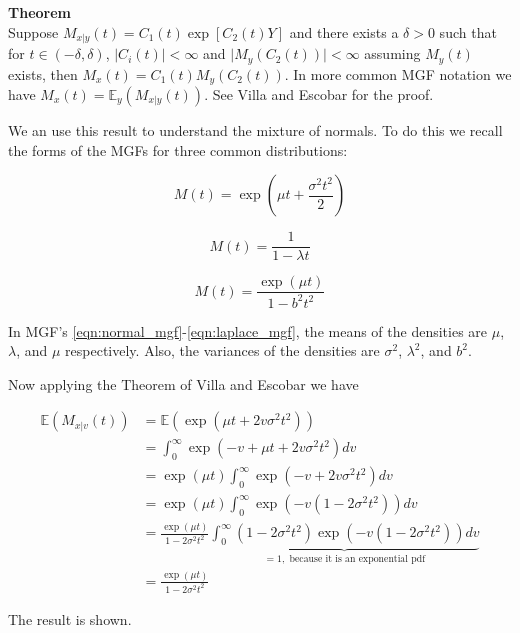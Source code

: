 \noindent \textbf{Theorem}\\

Suppose $M_{x\vert y}(t)=C_1(t)\exp[C_2(t)Y]$ and there exists a $\delta>0$ such that for $t\in(-\delta, \delta)$, $\vert C_i(t) \vert < \infty$  and $\vert M_y(C_2(t))\vert < \infty$ assuming $M_y(t)$ exists, then $M_x(t) =C_1(t)M_y(C_2(t))$. In more common MGF notation we have $M_x(t) = \mathbb{E}_y(M_{x\vert y}(t))$. 
See Villa and Escobar for the proof. 

We an use this result to understand the mixture of normals. To do this we recall the forms of the MGFs for three common distributions: 

\begin{equation}\label{eqn:normal_mgf}
M(t) = \exp\left(\mu t + \frac{\sigma^2t^2}{2}\right)
\end{equation}

\begin{equation}\label{eqn:exponential_mgf}
M(t) =\frac{1}{1-\lambda t}
\end{equation}

\begin{equation}\label{eqn:laplace_mgf}
M(t) = \frac{ \exp\left(\mu t\right) }{1-b^2t^2}
\end{equation}

In MGF's \ref{eqn:normal_mgf}-\ref{eqn:laplace_mgf}, the means of the densities are $\mu$, $\lambda$, and $\mu$ respectively. Also, the variances of the densities are $\sigma^2$, $\lambda^2$, and $b^2$.  

Now applying the Theorem of Villa and Escobar we have 

\begin{align*}
\mathbb{E}\left(M_{x\vert v}(t)\right)&=\mathbb{E}\left(\exp\left(\mu t +2v\sigma^2t^2  \right)\right) \\
&= \int_0^\infty \exp\left(-v +\mu t +2v\sigma^2t^2  \right)dv\\
&= \exp(\mu t) \int_0^\infty \exp\left(-v +2v\sigma^2t^2  \right)dv\\
&= \exp(\mu t) \int_0^\infty \exp\left(-v(1-2\sigma^2t^2)\right)dv\\
&= \frac{\exp(\mu t) }{1-2\sigma^2t^2} \underbrace{\int_0^\infty(1-2\sigma^2t^2)\exp\left(-v(1-2\sigma^2t^2)\right)dv}_{=1, \text{  because it is an exponential pdf}}\\
&= \frac{\exp(\mu t) }{1-2\sigma^2t^2}
\end{align*}

The result is shown. 
